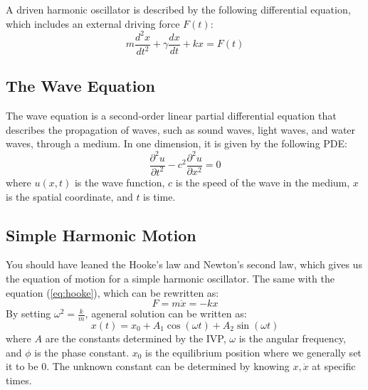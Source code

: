 \documentclass[11pt]{report}
\begin{document}
\begin{definition}
    A driven harmonic oscillator is described by the following differential equation, which includes an external driving force $F(t)$:
    \begin{equation}
        m \frac{d^2 x}{dt^2} + \gamma \frac{dx}{dt} + kx = F(t)   
    \end{equation}
\end{definition}
\subsection{The Wave Equation}

\begin{definition}
    The wave equation is a second-order linear partial differential equation that describes the propagation of waves, such as sound waves, light waves, and water waves, through a medium. In one dimension, it is given by the following PDE:
    \begin{equation}
        \frac{\partial^2 u}{\partial t^2} - c^2 \frac{\partial^2 u}{\partial x^2} = 0
    \end{equation}
    where \( u(x,t) \) is the wave function, \( c \) is the speed of the wave in the medium, \( x \) is the spatial coordinate, and \( t \) is time.
\end{definition}

\subsection{Simple Harmonic Motion}
\begin{definition}
    You should have leaned the Hooke's law and Newton's second law, which gives us the equation of motion for a simple harmonic oscillator. The same with the equation (\ref{eq:hooke}), which can be rewritten as:
    \begin{equation}
        F = m\ddot{x} = -kx
    \end{equation}
    By setting $\omega^2 = \frac{k}{m}$, ageneral solution can be written as:
    \begin{equation}
        x(t) = x_0 + A_1 \cos(\omega t) + A_2 \sin(\omega t)
    \end{equation}
    where \( A \) are the constants determined by the IVP, \( \omega \) is the angular frequency, and \( \phi \) is the phase constant. $x_0$ is the equilibrium position where we generally set it to be 0. The unknown constant can be determined by knowing $x, \dot{x}$ at specific times.
\end{definition}
\end{document}
